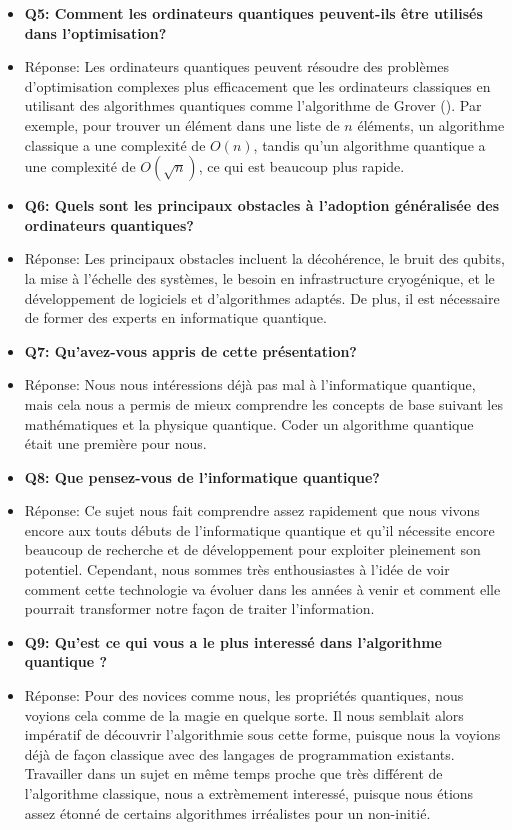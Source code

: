 \documentclass{article}
\begin{document}
\begin{itemize}
\\
  \item \textbf{Q5: Comment les ordinateurs quantiques peuvent-ils être utilisés dans l'optimisation?}
  \item Réponse: Les ordinateurs quantiques peuvent résoudre des problèmes d'optimisation complexes plus efficacement que les ordinateurs classiques en utilisant des algorithmes quantiques comme l'algorithme de Grover (\cite{wikipediaAlgorithmeGrover}). Par exemple, pour trouver un élément dans une liste de $n$ éléments, un algorithme classique a une complexité de $O(n)$, tandis qu'un algorithme quantique a une complexité de $O(\sqrt{n})$, ce qui est beaucoup plus rapide.
\\
  \item \textbf{Q6: Quels sont les principaux obstacles à l'adoption généralisée des ordinateurs quantiques?}
  \item Réponse: Les principaux obstacles incluent la décohérence, le bruit des qubits, la mise à l'échelle des systèmes, le besoin en infrastructure cryogénique, et le développement de logiciels et d'algorithmes adaptés. De plus, il est nécessaire de former des experts en informatique quantique.
\\  
  \item \textbf{Q7: Qu'avez-vous appris de cette présentation?}
  \item Réponse: Nous nous intéressions déjà pas mal à l'informatique quantique, mais cela nous a permis de mieux comprendre les concepts de base suivant les mathématiques et la physique quantique. Coder un algorithme quantique était une première pour nous.
\\  
  \item \textbf{Q8: Que pensez-vous de l'informatique quantique?}
  \item Réponse: Ce sujet nous fait comprendre assez rapidement que nous vivons encore aux touts débuts de l'informatique quantique et qu'il nécessite encore beaucoup de recherche et de développement pour exploiter pleinement son potentiel. Cependant, nous sommes très enthousiastes à l'idée de voir comment cette technologie va évoluer dans les années à venir et comment elle pourrait transformer notre façon de traiter l'information.
\\  
  \item \textbf{Q9: Qu'est ce qui vous a le plus interessé dans l'algorithme quantique ?}
  \item Réponse: Pour des novices comme nous, les propriétés quantiques, nous voyions cela comme de la magie en quelque sorte. Il nous semblait alors impératif de découvrir l'algorithmie sous cette forme, puisque nous la voyions déjà de façon classique avec des langages de programmation existants. Travailler dans un sujet en même temps proche que très différent de l'algorithme classique, nous a extrèmement interessé, puisque nous étions assez étonné de certains algorithmes irréalistes pour un non-initié.

\end{itemize}
\end{document}

